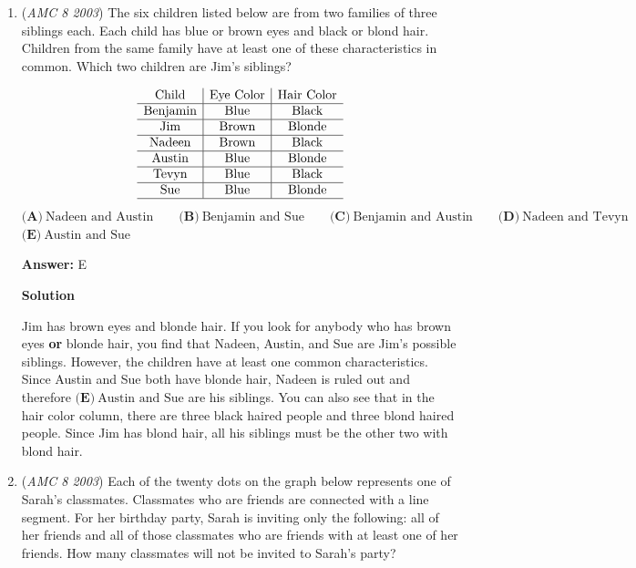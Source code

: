\begin{enumerate}
 Solution by \href{https://artofproblemsolving.com/wiki/index.php?title=User:ILoveMath31415926535}{ILoveMath31415926535}

 


	\item (\textit{AMC 8 2003}) The six children listed below are from two families of three siblings each. Each child has blue or brown eyes and black or blond hair. Children from the same family have at least one of these characteristics in common. Which two children are Jim's siblings?


 
 \[\begin{array}{c|c|c}\text{Child}&\text{Eye Color}&\text{Hair Color}\\ \hline\text{Benjamin}&\text{Blue}&\text{Black}\\ \hline\text{Jim}&\text{Brown}&\text{Blonde}\\ \hline\text{Nadeen}&\text{Brown}&\text{Black}\\ \hline\text{Austin}&\text{Blue}&\text{Blonde}\\ \hline\text{Tevyn}&\text{Blue}&\text{Black}\\ \hline\text{Sue}&\text{Blue}&\text{Blonde}\\ \hline\end{array}\]
$\textbf{(A)}\ \text{Nadeen and Austin}\qquad\textbf{(B)}\ \text{Benjamin and Sue}\qquad\textbf{(C)}\ \text{Benjamin and Austin}\qquad\textbf{(D)}\ \text{Nadeen and Tevyn}$
$\textbf{(E)}\ \text{Austin and Sue}$

 \textbf{Answer: }E



\textbf{Solution}

Jim has brown eyes and blonde hair. If you look for anybody who has brown eyes \textbf{or} blonde hair, you find that Nadeen, Austin, and Sue are Jim's possible siblings. However, the children have at least one common characteristics. Since Austin and Sue both have blonde hair, Nadeen is ruled out and therefore $\boxed{\textbf{(E)}\ \text{Austin and Sue}}$ are his siblings. You can also see that in the hair color column, there are three black haired people and three blond haired people.  Since Jim has blond hair, all his siblings must be the other two with blond hair.

 


	\item (\textit{AMC 8 2003}) Each of the twenty dots on the graph below represents one of Sarah's classmates.  Classmates who are friends are connected with a line segment.  For her birthday party, Sarah is inviting only the following:  all of her friends and all of those classmates who are friends with at least one of her friends.  How many classmates will not be invited to Sarah's party?


\end{enumerate}
